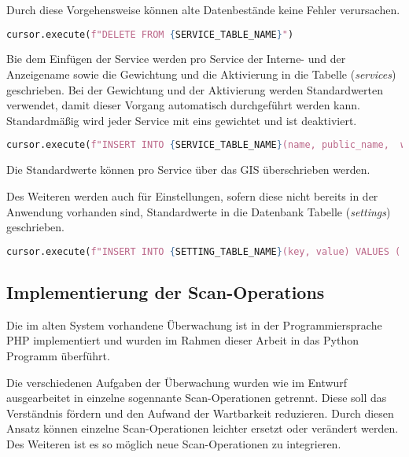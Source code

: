 Durch diese Vorgehensweise können alte Datenbestände keine Fehler verursachen.

\begin{lstlisting}[language=Python, frame=single, caption={Löschen der Services}, captionpos=b, label={lst:bigbrother-delete-service}]
cursor.execute(f"DELETE FROM {SERVICE_TABLE_NAME}")	
\end{lstlisting}

Bie dem Einfügen der Service werden pro Service der Interne- und der Anzeigename sowie die Gewichtung und die Aktivierung in die Tabelle (\textit{services}) geschrieben. Bei der Gewichtung und der Aktivierung werden Standardwerten verwendet, damit dieser Vorgang automatisch durchgeführt werden kann. Standardmäßig wird jeder Service mit eins gewichtet und ist deaktiviert.

\begin{lstlisting}[language=Python, frame=single, caption={Einfügen eines Services}, captionpos=b, label={lst:bigbrother-create-service}]
cursor.execute(f"INSERT INTO {SERVICE_TABLE_NAME}(name, public_name,  weight,  active) VALUES ('{name}', '{public_name}', 1, FALSE);")
\end{lstlisting}

Die Standardwerte können pro Service über das GIS überschrieben werden.

Des Weiteren werden auch für Einstellungen, sofern diese nicht bereits in der Anwendung vorhanden sind, Standardwerte in die Datenbank Tabelle (\textit{settings}) geschrieben.

\begin{lstlisting}[language=Python, frame=single, caption={Einfügen einer Einstellung}, captionpos=b, label={lst:bigbrother-create-settings}]
cursor.execute(f"INSERT INTO {SETTING_TABLE_NAME}(key, value) VALUES ('{default_value[0]}', '{default_value[1]}') ON CONFLICT (key) DO NOTHING;")
\end{lstlisting}


\subsection{Implementierung der Scan-Operations}
Die im alten System vorhandene Überwachung ist in der Programmiersprache PHP implementiert und wurden im Rahmen dieser Arbeit in das Python Programm überführt.

Die verschiedenen Aufgaben der Überwachung wurden wie im Entwurf ausgearbeitet in einzelne sogennante Scan-Operationen getrennt. Diese soll das Verständnis fördern und den Aufwand der Wartbarkeit reduzieren. Durch diesen Ansatz können einzelne Scan-Operationen leichter ersetzt oder verändert werden. Des Weiteren ist es so möglich neue Scan-Operationen zu integrieren.

